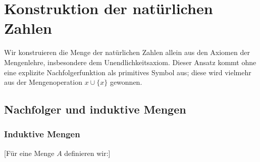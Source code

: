 \documentclass[main.tex]{subfiles}
\begin{document}
\chapter{Konstruktion der natürlichen Zahlen}

Wir konstruieren die Menge der natürlichen Zahlen allein aus den Axiomen der Mengenlehre, insbesondere dem Unendlichkeitsaxiom.  Dieser Ansatz kommt ohne eine explizite Nachfolgerfunktion als primitives Symbol aus; diese wird vielmehr aus der Mengenoperation \(x \cup \{x\}\) gewonnen.


\section{Nachfolger und induktive Mengen}

\subsection{Induktive Mengen}

[Für eine Menge \(A\) definieren wir:]

\begin{tabproof}
\end{tabproof}

\begin{tabproof}
\end{tabproof}

\begin{tabproof}
\end{tabproof}
\end{document}
